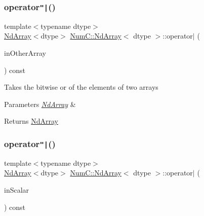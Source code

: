 \subsubsection{\texorpdfstring{operator\texttt{"|}()}{operator|()}\hspace{0.1cm}{\footnotesize\ttfamily [1/2]}}
{\footnotesize\ttfamily template$<$typename dtype$>$ \\
\mbox{\hyperlink{class_num_c_1_1_nd_array}{Nd\+Array}}$<$dtype$>$ \mbox{\hyperlink{class_num_c_1_1_nd_array}{Num\+C\+::\+Nd\+Array}}$<$ dtype $>$\+::operator$\vert$ (\begin{DoxyParamCaption}\item[{const \mbox{\hyperlink{class_num_c_1_1_nd_array}{Nd\+Array}}$<$ dtype $>$ \&}]{in\+Other\+Array }\end{DoxyParamCaption}) const\hspace{0.3cm}{\ttfamily [inline]}}

Takes the bitwise or of the elements of two arrays


\begin{DoxyParams}{Parameters}
{\em \mbox{\hyperlink{class_num_c_1_1_nd_array}{Nd\+Array}}} & \\
\hline
\end{DoxyParams}
\begin{DoxyReturn}{Returns}
\mbox{\hyperlink{class_num_c_1_1_nd_array}{Nd\+Array}} 
\end{DoxyReturn}
\mbox{\label{class_num_c_1_1_nd_array_a09200210c896b5547fe64f135c7e8f7b}} 
\subsubsection{\texorpdfstring{operator\texttt{"|}()}{operator|()}\hspace{0.1cm}{\footnotesize\ttfamily [2/2]}}
{\footnotesize\ttfamily template$<$typename dtype$>$ \\
\mbox{\hyperlink{class_num_c_1_1_nd_array}{Nd\+Array}}$<$dtype$>$ \mbox{\hyperlink{class_num_c_1_1_nd_array}{Num\+C\+::\+Nd\+Array}}$<$ dtype $>$\+::operator$\vert$ (\begin{DoxyParamCaption}\item[{dtype}]{in\+Scalar }\end{DoxyParamCaption}) const\hspace{0.3cm}{\ttfamily [inline]}}

